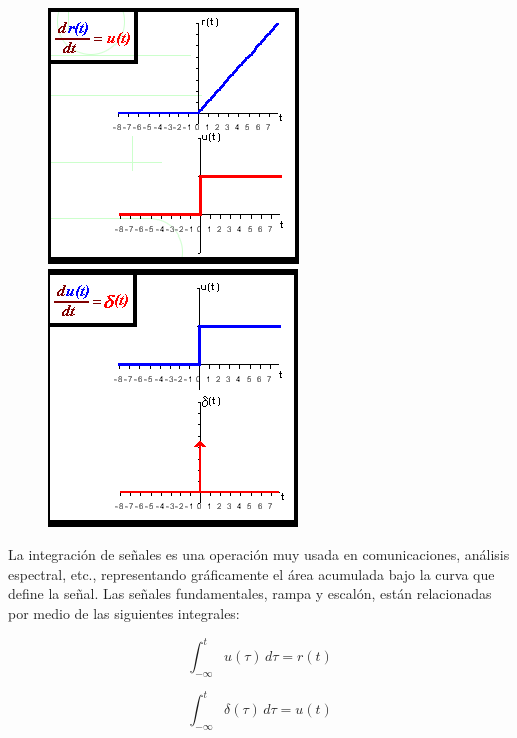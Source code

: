 \begin{figure}[h]
	
	\includegraphics[scale=0.55]{3}
	\includegraphics[scale=0.55]{4}
	\label{fig:4}
	\centering
\end{figure}

La integración de señales es una operación muy usada en comunicaciones, análisis espectral, etc., representando gráficamente el área acumulada bajo la curva que define la señal.
Las señales fundamentales, rampa y escalón,  están relacionadas por medio de las siguientes integrales:

\[
\int_{-\infty}^{t} \! u(\tau)  \,d\tau = r(t)
\]

\[
\int_{-\infty}^{t} \! \delta(\tau)  \,d\tau = u(t)
\]

